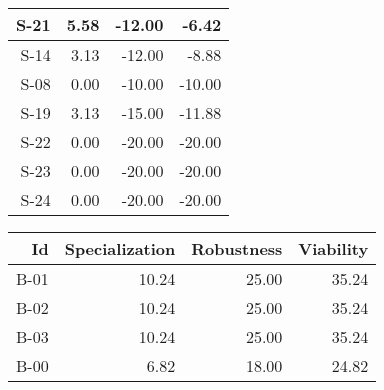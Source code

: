 \begin{tabular}{ | r | r | r | r | }
    \hline
                  S-21  &            5.58  &          -12.00  &           -6.42  \\
    \hline
                  S-14  &            3.13  &          -12.00  &           -8.88  \\
    \hline
                  S-08  &            0.00  &          -10.00  &          -10.00  \\
    \hline
                  S-19  &            3.13  &          -15.00  &          -11.88  \\
    \hline
                  S-22  &            0.00  &          -20.00  &          -20.00  \\
    \hline
                  S-23  &            0.00  &          -20.00  &          -20.00  \\
    \hline
                  S-24  &            0.00  &          -20.00  &          -20.00  \\
    \hline
\end{tabular}


\begin{tabular}{ | r | r | r | r | }
    \hline
                    Id  &  Specialization  &      Robustness  &       Viability  \\
    \hline
    \hline
                  B-01  &           10.24  &           25.00  &           35.24  \\
    \hline
                  B-02  &           10.24  &           25.00  &           35.24  \\
    \hline
                  B-03  &           10.24  &           25.00  &           35.24  \\
    \hline
                  B-00  &            6.82  &           18.00  &           24.82  \\
    \hline
\end{tabular}


